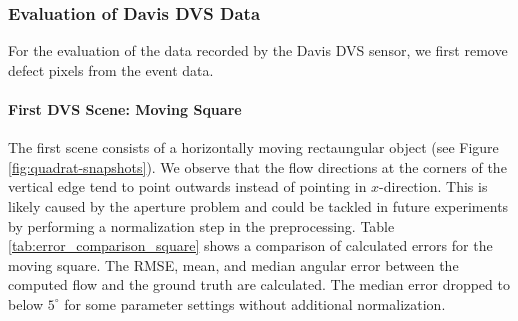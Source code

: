 \subsubsection{Evaluation of Davis DVS Data}
For the evaluation of the data recorded by the Davis DVS sensor, we first remove defect pixels from the event data.

\paragraph{First DVS Scene: Moving Square}
The first scene consists of a horizontally moving rectaungular object (see Figure \ref{fig:quadrat-snapshots}).
We observe that the flow directions at the corners of the vertical edge tend to point outwards instead of pointing in $x$-direction. 
This is likely caused by the aperture problem and could be tackled in future experiments by performing a normalization step in the preprocessing.
Table \ref{tab:error_comparison_square} shows a comparison of calculated errors for the moving square. The RMSE, mean, and median angular error between the computed flow and the ground truth are calculated. 
The median error dropped to below $5^\circ$ for some parameter settings without additional normalization. 



